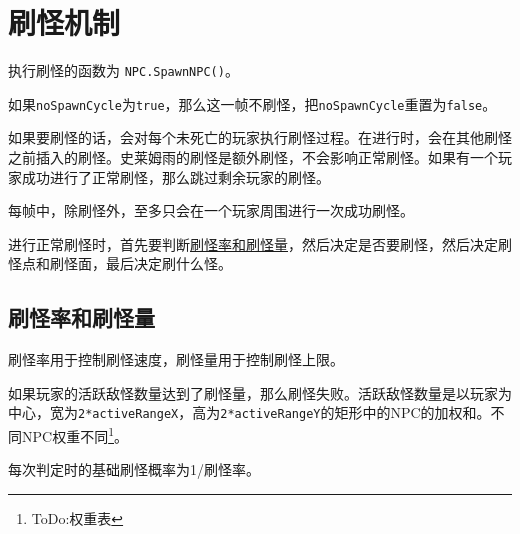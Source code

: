 \chapter{刷怪机制}\label{app31}
执行刷怪的函数为 \lstinline{NPC.SpawnNPC()}。

如果\lstinline{noSpawnCycle}为\lstinline{true}，那么这一帧不刷怪，把\lstinline{noSpawnCycle}重置为\lstinline{false}。

如果要刷怪的话，会对每个未死亡的玩家执行刷怪过程。在进行时，会在其他刷怪之前插入的刷怪。史莱姆雨的刷怪是额外刷怪，不会影响正常刷怪。如果有一个玩家成功进行了正常刷怪，那么跳过剩余玩家的刷怪。

\begin{remark}
每帧中，除刷怪外，至多只会在一个玩家周围进行一次成功刷怪。
\end{remark}

进行正常刷怪时，首先要判断\hyperref[app33]{刷怪率和刷怪量}，然后决定是否要刷怪，然后决定刷怪点和刷怪面，最后决定刷什么怪。

\section{刷怪率和刷怪量}\label{app33}
刷怪率用于控制刷怪速度，刷怪量用于控制刷怪上限。

如果玩家的活跃敌怪数量达到了刷怪量，那么刷怪失败。活跃敌怪数量是以玩家为中心，宽为\lstinline{2*activeRangeX}，高为\lstinline{2*activeRangeY}的矩形中的NPC的加权和。不同NPC权重不同\footnote{ToDo:权重表}。

每次判定时的基础刷怪概率为1/刷怪率。

